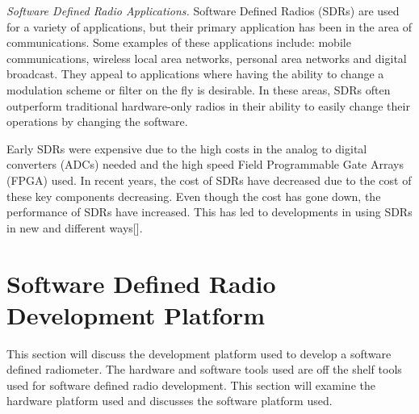 \emph{Software Defined Radio Applications.}  Software Defined Radios (SDRs) are used for a variety of applications, but their primary application has been in the area of communications.  Some examples of these applications include:  mobile communications, wireless local area networks, personal area networks and digital broadcast.  They appeal to applications where having the ability to change a modulation scheme or filter on the fly is desirable.  In these areas, SDRs often outperform traditional hardware-only radios in their ability to easily change their operations by changing the software.  

Early SDRs were expensive due to the high costs in the analog to digital converters (ADCs) needed and the high speed Field Programmable Gate Arrays (FPGA) used.  In recent years, the cost of SDRs have decreased due to the cost of these key components decreasing.  Even though the cost has gone down, the performance of SDRs have increased.  This has led to developments in using SDRs in new and different ways[\cite{jondral2005software}].



\section{Software Defined Radio Development Platform} \label{SDR_platform}
This section will discuss the development platform used to develop a software defined radiometer.  The hardware and software tools used are off the shelf tools used for software defined radio development.  This section will examine the hardware platform used and discusses the software platform used.  


